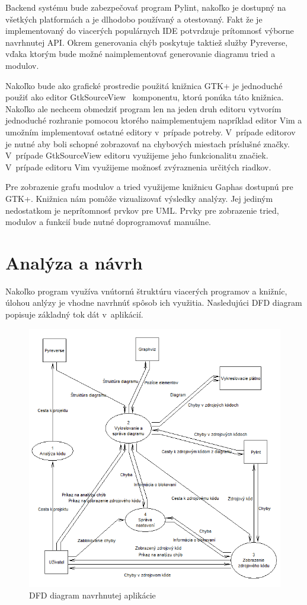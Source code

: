 \documentclass[11pt,oneside,final]{fithesis2}
\begin{document}
		Backend systému bude zabezpečovať program Pylint, nakoľko je dostupný na všetkých platformách a je dlhodobo používaný a otestovaný. Fakt že je implementovaný do viacerých populárnych IDE potvrdzuje prítomnosť výborne navrhnutej API. Okrem generovania chýb poskytuje taktiež služby Pyreverse, vďaka ktorým bude možné naimplementovať generovanie diagramu tried a modulov.
		
		Nakoľko bude ako grafické prostredie použitá knižnica GTK+ je jednoduché použiť ako editor GtkSourceView~\cite{gtksourceview} komponentu, ktorú ponúka táto knižnica. Nakoľko ale nechcem obmedziť program len na jeden druh editoru vytvorím jednoduché rozhranie pomocou ktorého naimplementujem napríklad editor Vim a umožním implementovať ostatné editory v~prípade potreby. V~prípade editorov je nutné aby boli schopné zobrazovať na chybových miestach príslušné značky. V~prípade GtkSourceView editoru využijeme jeho funkcionalitu značiek. V~prípade editoru Vim využijeme možnosť zvýraznenia určitých riadkov.
		
		Pre zobrazenie grafu modulov a tried využijeme knižnicu Gaphas dostupnú pre GTK+. Knižnica nám pomôže vizualizovať výsledky analýzy. Jej jediným nedostatkom je neprítomnosť prvkov pre UML. Prvky pre zobrazenie tried, modulov a funkcií bude nutné doprogramovať manuálne.


	\section{Analýza a návrh}
	
	Nakoľko program využíva vnútornú štruktúru viacerých programov a knižníc, úlohou anlýzy je vhodne navrhnúť spôsob ich využitia. Nasledujúci DFD diagram popisuje základný tok dát v~aplikácií. 	
	
	\begin{figure}[htb]
	 \centering
	 \includegraphics[width=\textwidth]{images/dfd_main}
	 \caption{DFD diagram navrhnutej aplikácie}
	\end{figure}
	
\end{document}
